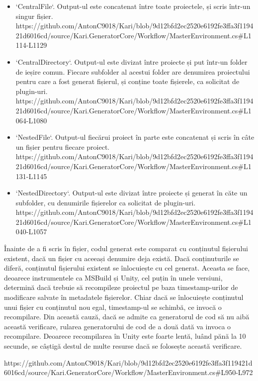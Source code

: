 \documentclass{report}
\begin{document}
\begin{itemize}
\item `CentralFile`. Output-ul este concatenat între toate proiectele, și scris într-un singur fișier.
  https://github.com/AntonC9018/Kari/blob/9d12bfd2ec2520e6192fe3ffa3f119421d6016cd/source/Kari.GeneratorCore/Workflow/MasterEnvironment.cs#L1114-L1129

\item `CentralDirectory`. Output-ul este divizat între proiecte și put într-un folder de ieșire comun.
  Fiecare subfolder al acestui folder are denumirea proiectului pentru care a fost generat fișierul, și conține toate fișierele, ca solicitat de plugin-uri.
  https://github.com/AntonC9018/Kari/blob/9d12bfd2ec2520e6192fe3ffa3f119421d6016cd/source/Kari.GeneratorCore/Workflow/MasterEnvironment.cs#L1064-L1080

\item `NestedFile`. Output-ul fiecărui proiect în parte este concatenat și scris în câte un fișier pentru fiecare proiect.
  https://github.com/AntonC9018/Kari/blob/9d12bfd2ec2520e6192fe3ffa3f119421d6016cd/source/Kari.GeneratorCore/Workflow/MasterEnvironment.cs#L1131-L1145

\item `NestedDirectory`. Output-ul este divizat între proiecte și generat în căte un subfolder, cu denumirile fișierelor ca solicitat de plugin-uri.
  https://github.com/AntonC9018/Kari/blob/9d12bfd2ec2520e6192fe3ffa3f119421d6016cd/source/Kari.GeneratorCore/Workflow/MasterEnvironment.cs#L1040-L1057
\end{itemize}

Înainte de a fi scris în fișier, codul generat este comparat cu conținutul fișierului existent, dacă un fișier cu aceeași denumire deja există.
Dacă conținuturile se diferă, conținutul fișierului existent se înlocuiește cu cel generat.
Aceasta se face, deoarece instrumentele ca MSBuild și Unity, cel puțin în unele versiuni, determină dacă trebuie să recompileze proiectul pe baza timestamp-urilor de modificare salvate în metadatele fișierelor.
Chiar dacă se înlocuiește conținutul unui fișier cu conținutul nou egal, timestamp-ul se schimbă, ce invocă o recompilare.
Din această cauză, dacă se admite ca generatorul de cod să nu aibă această verificare, rularea generatorului de cod de a două dată va invoca o recompilare.
Deoarece recompilarea în Unity este foarte lentă, luând pănă la 10 secunde, se câștigă destul de multe resurse dacă se folosește această verificare.

https://github.com/AntonC9018/Kari/blob/9d12bfd2ec2520e6192fe3ffa3f119421d6016cd/source/Kari.GeneratorCore/Workflow/MasterEnvironment.cs#L950-L972
\end{document}
